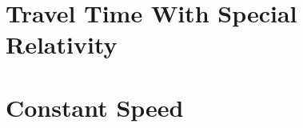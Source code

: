 \documentclass[10pt]{article}
\numberwithin{equation}{section}
\begin{document}
	\section{Travel Time With Special Relativity}
	
	\section{Constant Speed}
\end{document}
